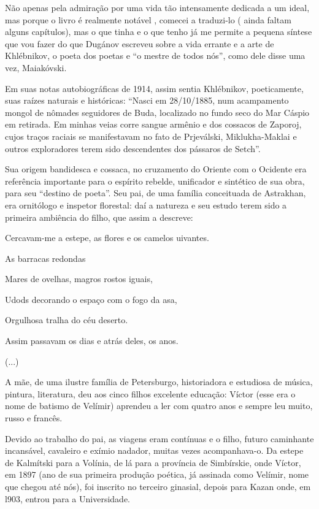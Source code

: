 Não apenas pela admiração por uma vida tão intensamente dedicada a um
ideal, mas porque o livro é realmente notável , comecei a traduzi-lo (
ainda faltam alguns capítulos), mas o que tinha e o que tenho já me
permite a pequena síntese que vou fazer do que Dugánov escreveu sobre a
vida errante e a arte de Khlébnikov, o poeta dos poetas e ``o mestre de
todos nós'', como dele disse uma vez, Maiakóvski.

Em suas notas autobiográficas de 1914, assim sentia Khlébnikov,
poeticamente, suas raízes naturais e históricas: ``Nasci em 28/10/1885,
num acampamento mongol de nômades seguidores de Buda, localizado no
fundo seco do Mar Cáspio em retirada. Em minhas veias corre sangue
armênio e dos cossacos de Zaporoj, cujos traços raciais se manifestavam
no fato de Prjeválski, Miklukha-Maklai e outros exploradores terem sido
descendentes dos pássaros de Setch''.

Sua origem bandidesca e cossaca, no cruzamento do Oriente com o Ocidente
era referência importante para o espírito rebelde, unificador e
sintético de sua obra, para seu ``destino de poeta''. Seu pai, de uma
família conceituada de Astrakhan, era ornitólogo e inspetor florestal:
daí a natureza e seu estudo terem sido a primeira ambiência do filho,
que assim a descreve:

Cercavam-me a estepe, as flores e os camelos uivantes.

As barracas redondas

Mares de ovelhas, magros rostos iguais,

Udods decorando o espaço com o fogo da asa,

Orgulhosa tralha do céu deserto.

Assim passavam os dias e atrás deles, os anos.

(...)

A mãe, de uma ilustre família de Petersburgo, historiadora e estudiosa
de música, pintura, literatura, deu aos cinco filhos excelente educação:
Víctor (esse era o nome de batismo de Velímir) aprendeu a ler com quatro
anos e sempre leu muito, russo e francês.

Devido ao trabalho do pai, as viagens eram contínuas e o filho, futuro
caminhante incansável, cavaleiro e exímio nadador, muitas vezes
acompanhava-o. Da estepe de Kalmítski para a Volínia, de lá para a
província de Simbírskie, onde Víctor, em 1897 (ano de sua primeira
produção poética, já assinada como Velímir, nome que chegou até nós),
foi inscrito no terceiro ginasial, depois para Kazan onde, em l903,
entrou para a Universidade.

